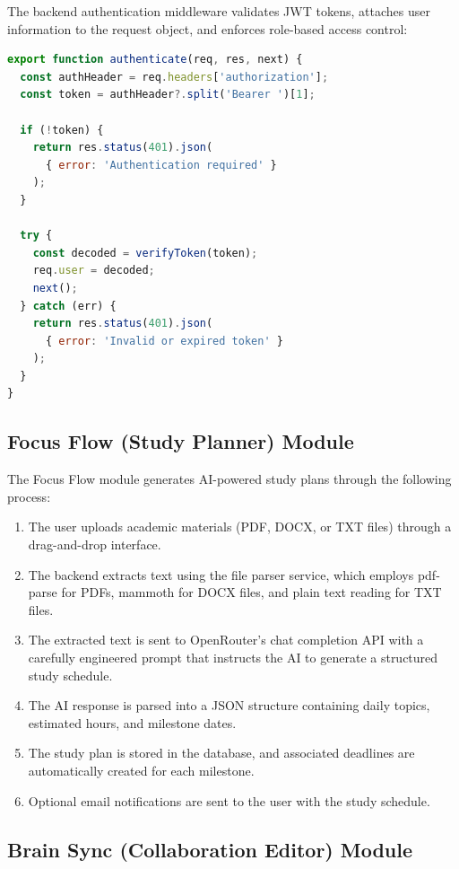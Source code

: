 \documentclass[12pt,a4paper]{report}
\begin{document}
The backend authentication middleware validates JWT tokens, attaches user information to the request object, and enforces role-based access control:

\begin{lstlisting}[language=JavaScript, caption={Authentication Middleware}]
export function authenticate(req, res, next) {
  const authHeader = req.headers['authorization'];
  const token = authHeader?.split('Bearer ')[1];

  if (!token) {
    return res.status(401).json(
      { error: 'Authentication required' }
    );
  }

  try {
    const decoded = verifyToken(token);
    req.user = decoded;
    next();
  } catch (err) {
    return res.status(401).json(
      { error: 'Invalid or expired token' }
    );
  }
}
\end{lstlisting}

\subsection{Focus Flow (Study Planner) Module}

The Focus Flow module generates AI-powered study plans through the following process:

\begin{enumerate}
    \item The user uploads academic materials (PDF, DOCX, or TXT files) through a drag-and-drop interface.
    \item The backend extracts text using the file parser service, which employs pdf-parse for PDFs, mammoth for DOCX files, and plain text reading for TXT files.
    \item The extracted text is sent to OpenRouter's chat completion API with a carefully engineered prompt that instructs the AI to generate a structured study schedule.
    \item The AI response is parsed into a JSON structure containing daily topics, estimated hours, and milestone dates.
    \item The study plan is stored in the database, and associated deadlines are automatically created for each milestone.
    \item Optional email notifications are sent to the user with the study schedule.
\end{enumerate}

\subsection{Brain Sync (Collaboration Editor) Module}
\end{document}

